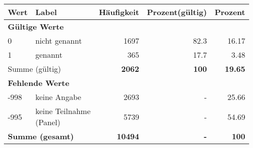      \begin{longtable}{lXrrr}
     \toprule
     \textbf{Wert} & \textbf{Label} & \textbf{Häufigkeit} & \textbf{Prozent(gültig)} & \textbf{Prozent} \\
     \endhead
     \midrule
     \multicolumn{5}{l}{\textbf{Gültige Werte}}\\

     0 &
     \multicolumn{1}{X}{ nicht genannt   } &


       \num{1697} &
       \num[round-mode=places,round-precision=2]{82.3} &
         \num[round-mode=places,round-precision=2]{16.17} \\

     1 &
     \multicolumn{1}{X}{ genannt   } &


       \num{365} &
       \num[round-mode=places,round-precision=2]{17.7} &
         \num[round-mode=places,round-precision=2]{3.48} \\
     \midrule
     \multicolumn{2}{l}{Summe (gültig)} &
       \textbf{\num{2062}} &
     \textbf{\num{100}} &
       \textbf{\num[round-mode=places,round-precision=2]{19.65}} \\
     \multicolumn{5}{l}{\textbf{Fehlende Werte}}\\
       -998 &
       keine Angabe &
         \num{2693} &
        - &
         \num[round-mode=places,round-precision=2]{25.66} \\
       -995 &
       keine Teilnahme (Panel) &
         \num{5739} &
        - &
         \num[round-mode=places,round-precision=2]{54.69} \\
     \midrule
     \multicolumn{2}{l}{\textbf{Summe (gesamt)}} &
          \textbf{\num{10494}} &
        \textbf{-} &
        \textbf{\num{100}} \\
     \bottomrule
     \end{longtable}
     
